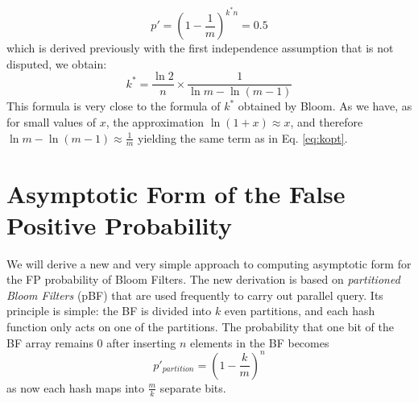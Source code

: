 \begin{equation}
p'=\left(1-\frac{1}{m}\right)^{k^* n}=0.5
\label{equ:p=0.5}
\end{equation}
which is derived previously with the first independence assumption that is not disputed, we obtain:
\begin{equation}
\label{kform}
k^*=\dfrac{\ln 2}{n} \times \dfrac{1}{\ln m-\ln (m-1)} 
\end{equation}
This formula is very close to the formula of $k^*$ obtained by Bloom. As we have, as for small values of $x$, the approximation $\ln (1+x)\approx x$, and therefore $\ln m-\ln (m-1) \approx \frac{1}{m}$ yielding the same term as in Eq. \ref{eq:kopt}. 



\section{Asymptotic Form of the False Positive Probability}
\label{sec:limitf}
We will derive a new and very simple approach to computing asymptotic form for the FP probability of Bloom Filters. The new derivation is based on \textit{partitioned Bloom Filters} (pBF) that are used frequently to carry out parallel query. Its principle is simple: the BF is divided into $k$ even partitions, and each hash function only acts on one of the partitions. %
The probability that one bit of the BF array remains 0 after inserting $n$ elements in the BF becomes
\begin{equation}
p'_{partition} = \left( 1-\dfrac{k}{m} \right)^n
\end{equation}
as now each hash maps into $\frac{m}{k}$ separate bits.

